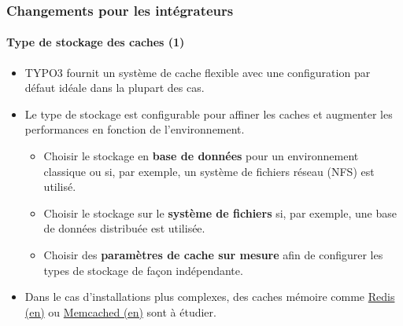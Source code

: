 \begin{frame}[fragile]
	\frametitle{Changements pour les intégrateurs}
	\framesubtitle{Type de stockage des caches (1)}

	\begin{itemize}

		\item TYPO3 fournit un système de cache flexible avec une configuration
				par défaut idéale dans la plupart des cas.
		\item Le type de stockage est configurable pour affiner les caches et
		augmenter les performances en fonction de l'environnement.

		\begin{itemize}
			\item Choisir le stockage en \textbf{base de données} pour un environnement classique
				ou si, par exemple, un système de fichiers réseau (NFS) est utilisé.
			\item Choisir le stockage sur le \textbf{système de fichiers} si, par exemple,
				une base de données distribuée est utilisée.
			\item Choisir des \textbf{paramètres de cache sur mesure} afin de configurer les types de stockage
				de façon indépendante.
		\end{itemize}

		\item Dans le cas d'installations plus complexes, des caches mémoire comme
			\href{https://redis.io/}{Redis (en)}
			ou
			\href{https://memcached.org/}{Memcached (en)} sont à étudier.

	\end{itemize}

\end{frame}


%

